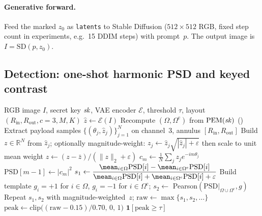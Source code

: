 \paragraph{Generative forward.}
Feed the marked \(z_0\) as \texttt{latents} to Stable Diffusion
(\(512\times512\) RGB, fixed step count in experiments, e.g.\ 15 DDIM steps) with
prompt~\(p\).
The output image is \(I=\mathrm{SD}(p,z_0)\).

\subsection{Detection: one-shot harmonic PSD and keyed contrast}
\label{sec:anyangle-detect}

\begin{algorithm}[t]
\caption{Blind detection (any-angle circ-harmonic NTRU)}
\label{alg:anyangle-detect}
\begin{algorithmic}[1]
\Require RGB image \(I\), secret key \(\mathit{sk}\), VAE encoder \(\mathcal{E}\),
  threshold \(\tau\), layout \((R_{\mathrm{in}},R_{\mathrm{out}},c=3,M,K)\)
\State \(\hat z \leftarrow \mathcal{E}(I)\) 
\State Recompute \((\Omega,\Omega^{\mathrm c})\) from \(\mathrm{PEM}(\mathit{sk})\) ()
\State Extract payload samples \(\{(\theta_j,\hat z_j)\}_{j=1}^{N}\) on channel~3,
  annulus \([R_{\mathrm{in}},R_{\mathrm{out}}]\)
\State Build \(z\in\mathbb{R}^N\) from \(\hat z_j\); optionally magnitude-weight:
  \(z_j\leftarrow \hat z_j\sqrt{|\hat z_j|+\varepsilon}\) then scale to unit mean weight
\State \(z\leftarrow (z-\bar z)/(\|z\|_2+\varepsilon)\)
  \State \(c_m \leftarrow \frac{1}{N}\sum_j z_j e^{-im\theta_j}\) 
  \State \(\mathrm{PSD}[m-1] \leftarrow |c_m|^2\)
\EndFor
\State \(s_1 \leftarrow \dfrac{\mean_{i\in\Omega}\mathrm{PSD}[i]-\mean_{i\in\Omega^{\mathrm c}}\mathrm{PSD}[i]}
  {\mean_{i\in\Omega}\mathrm{PSD}[i]+\mean_{i\in\Omega^{\mathrm c}}\mathrm{PSD}[i]+\varepsilon}\)
\State Build template \(g_i=+1\) for \(i\in\Omega\), \(g_i=-1\) for \(i\in\Omega^{\mathrm c}\);
  \(s_2\leftarrow\) Pearson\((\mathrm{PSD}|_{\Omega\cup\Omega^{\mathrm c}}, g)\)
\State Repeat \(s_1,s_2\) with magnitude-weighted~\(z\); \(\mathrm{raw}\leftarrow\max\{s_1,s_2,\ldots\}\)
\State \(\mathrm{peak}\leftarrow \mathrm{clip}\bigl((\mathrm{raw}-0.15)/0.70,\,0,\,1\bigr)\)
\State \Return \(\mathbf{1}[\mathrm{peak}\ge\tau]\)
\end{algorithmic}
\end{algorithm}

